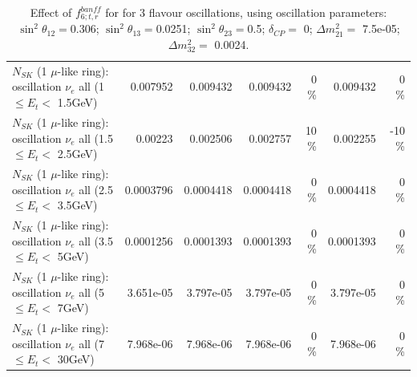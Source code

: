 \begin{table}
\begin{tabular}{| l | r | r | r  r | r  r |}
$N_{SK}$ (1 $\mu$-like ring): oscillation $\nu_{e}$ all (1 $\leq E_{t} <$ 1.5GeV) &        0.007952 &        0.009432 &        0.009432 &        0 \%  &        0.009432 &        0 \%  \\ 
$N_{SK}$ (1 $\mu$-like ring): oscillation $\nu_{e}$ all (1.5 $\leq E_{t} <$ 2.5GeV) &         0.00223 &        0.002506 &        0.002757 &       10 \%  &        0.002255 &      -10 \%  \\ 
$N_{SK}$ (1 $\mu$-like ring): oscillation $\nu_{e}$ all (2.5 $\leq E_{t} <$ 3.5GeV) &       0.0003796 &       0.0004418 &       0.0004418 &        0 \%  &       0.0004418 &        0 \%  \\ 
$N_{SK}$ (1 $\mu$-like ring): oscillation $\nu_{e}$ all (3.5 $\leq E_{t} <$ 5GeV) &       0.0001256 &       0.0001393 &       0.0001393 &        0 \%  &       0.0001393 &        0 \%  \\ 
 $N_{SK}$ (1 $\mu$-like ring): oscillation $\nu_{e}$ all (5 $\leq E_{t} <$ 7GeV) &       3.651e-05 &       3.797e-05 &       3.797e-05 &        0 \%  &       3.797e-05 &        0 \%  \\ 
$N_{SK}$ (1 $\mu$-like ring): oscillation $\nu_{e}$ all (7 $\leq E_{t} <$ 30GeV) &       7.968e-06 &       7.968e-06 &       7.968e-06 &        0 \%  &       7.968e-06 &        0 \%  \\ 
\hline
\hline
\end{tabular}
\caption{ Effect of $f_{6; t, r}^{banff}$ for for 3 flavour oscillations, using oscillation parameters:  $\sin^2\theta_{12} = $0.306; $\sin^2\theta_{13} = $0.0251; $\sin^2\theta_{23} = $0.5; $\delta_{CP} = $        0; $\Delta m^2_{21} = $    7.5e-05; $\Delta m^2_{32} = $    0.0024. }
\label{tab:num_banff_06_1RmuT_3f_osc_t13:0.0251}
\end{table}
\clearpage

